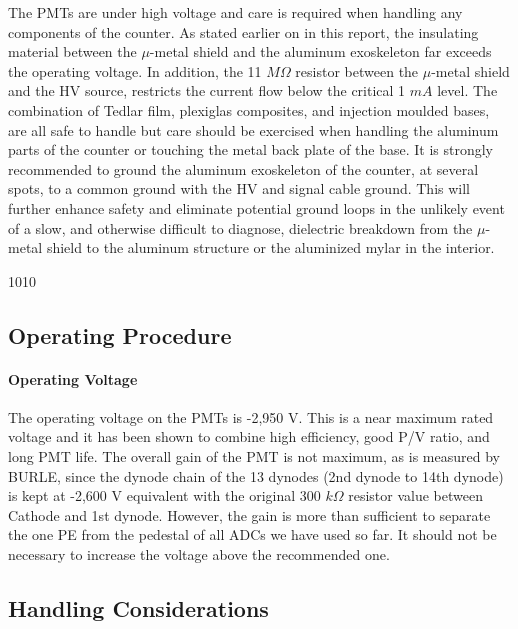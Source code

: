 \begin{safetyen}{10}{10}
The PMTs are under high voltage and care is required when handling any 
components of the counter. As stated earlier on in this report, the insulating 
material between the $\mu$-metal shield and the aluminum exoskeleton far 
exceeds the operating voltage. In addition, the 11 $M\Omega$ resistor between 
the $\mu$-metal shield and the HV source, restricts the current flow below the  
critical 1 $mA$ level. The combination of Tedlar film, plexiglas composites, 
and injection moulded bases, are all safe to handle but care should be 
exercised when handling the aluminum parts of the counter or touching the metal 
back plate of the base. It is strongly recommended to ground the aluminum 
exoskeleton of the counter, at several spots, to a common ground with the HV 
and signal cable ground. This will further enhance safety and eliminate 
potential ground loops in the unlikely event of a slow, and otherwise difficult 
to diagnose, dielectric breakdown from the $\mu$-metal shield to the aluminum 
structure or the aluminized mylar in the interior.  
\end{safetyen}{10}{10}

\subsection{Operating Procedure}

\paragraph{Operating Voltage}

The operating voltage on the PMTs is -2,950 V. This is a near maximum rated 
voltage and it has been shown to combine high efficiency, good P/V ratio,   
and long PMT life. The overall gain of the PMT is not maximum, as is   
measured by BURLE, since the dynode chain of the 13 dynodes (2nd dynode to   
14th dynode) is kept at -2,600 V equivalent with the original 300 $k\Omega$   
resistor value between Cathode and 1st dynode. However, the gain is more   
than sufficient to separate the one PE from the pedestal of all ADCs we have   
used so far. It should not be necessary to increase the voltage above the   
recommended one. 

\subsection{Handling Considerations}

